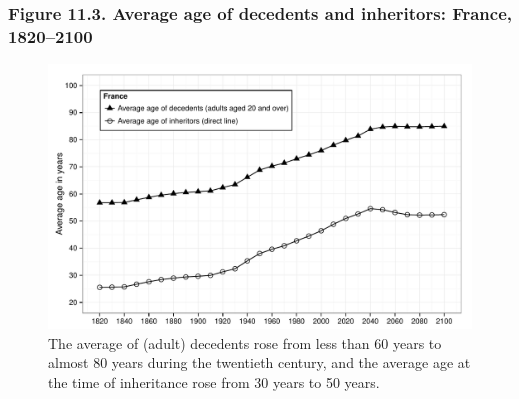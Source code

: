\documentclass[t]{beamer}\usepackage[]{graphicx}\usepackage[]{color}
\newenvironment{knitrout}{}{} %
\begin{document}
\begin{frame}[label=Figure_11_3]
\frametitle{Figure 11.3. Average age of decedents and inheritors: France, 1820--2100}
\begin{figure}[t]
\begin{minipage}[b]{\textwidth}
\centering
\begin{knitrout}\footnotesize
{}\color{fgcolor}

{\centering \includegraphics[width=1\linewidth]{figures/bw/Figure_11_3} 

}



\end{knitrout}
\caption{The average of (adult) decedents rose from less than 60 years to almost 80 years during the twentieth century, and the average age at the time of inheritance rose from 30 years to 50 years.}
\end{minipage}
\end{figure}
\end{frame}
\end{document}
